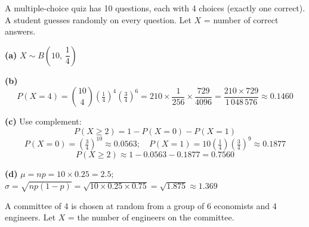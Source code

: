 \documentclass[addpoints]{exam}
\begin{document}
\begin{questions}
\question A multiple-choice quiz has 10 questions, each with 4 choices (exactly one correct).
A student guesses randomly on every question. Let $X$ = number of correct answers.
\begin{solution}[9cm]
\textbf{(a)} $X \sim B\!\left(10,\,\dfrac{1}{4}\right)$

\textbf{(b)}
\[
P(X=4) = \binom{10}{4}\!\left(\tfrac{1}{4}\right)^4\!\left(\tfrac{3}{4}\right)^6
= 210 \times \frac{1}{256} \times \frac{729}{4096}
= \frac{210 \times 729}{1\,048\,576} \approx \mathbf{0.1460}
\]

\textbf{(c)} Use complement:
\[
P(X \geq 2) = 1 - P(X=0) - P(X=1)
\]
\[
P(X=0) = \left(\tfrac{3}{4}\right)^{10} \approx 0.0563;\quad
P(X=1) = 10\left(\tfrac{1}{4}\right)\!\left(\tfrac{3}{4}\right)^9 \approx 0.1877
\]
\[
P(X \geq 2) \approx 1 - 0.0563 - 0.1877 = \mathbf{0.7560}
\]

\textbf{(d)} $\mu = np = 10 \times 0.25 = \mathbf{2.5}$;
$\sigma = \sqrt{np(1-p)} = \sqrt{10 \times 0.25 \times 0.75} = \sqrt{1.875} \approx \mathbf{1.369}$
\end{solution}

\question A committee of 4 is chosen at random from a group of 6 economists and 4 engineers.
Let $X$ = the number of engineers on the committee.
\end{questions}
\end{document}
